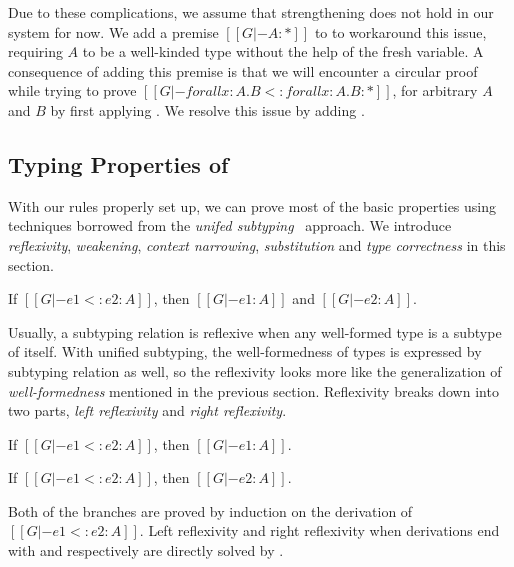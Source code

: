 Due to these complications, we assume that strengthening does not hold in our system for now.
We add a premise $[[G |- A : *]]$ to  to workaround this issue,
requiring $A$ to be a well-kinded type without the help of the fresh variable.
A consequence of adding this premise is that we will encounter a circular proof
while trying to prove $[[G |- forall x : A. B <: forall x : A . B : *]]$, for
arbitrary $A$ and $B$ by first applying . We resolve this issue by
adding .

\subsection{Typing Properties of \name}
\label{sec:typing-properties}

With our rules properly set up, we can prove most of the basic properties
using techniques borrowed from the \emph{unifed subtyping}~\citep{full} approach.
We introduce \emph{reflexivity}, \emph{weakening},
\emph{context narrowing}, \emph{substitution} and \emph{type correctness}
in this section.

\begin{theorem}[Reflexivity]
   If $[[G |- e1 <: e2 : A]]$,
   then $[[G |- e1 : A]]$ and $[[G |- e2 : A]]$.
\end{theorem}

Usually, a subtyping relation is reflexive when any well-formed type is a subtype
of itself. With unified subtyping, the well-formedness of types is expressed by
subtyping relation as well, so the reflexivity looks more like the generalization
of \emph{well-formedness} mentioned in the previous section. Reflexivity
breaks down into two parts, \emph{left reflexivity} and \emph{right reflexivity}.

\begin{lemma}
   If $[[G |- e1 <: e2 : A]]$,
   then $[[G |- e1 : A]]$.
\end{lemma}

\begin{lemma}
   If $[[G |- e1 <: e2 : A]]$,
   then $[[G |- e2 : A]]$.
\end{lemma}

\noindent Both of the branches are proved by induction on the derivation of
$[[G |- e1 <: e2 : A]]$.
Left reflexivity and right reflexivity when derivations end with 
and  respectively are directly solved by .

